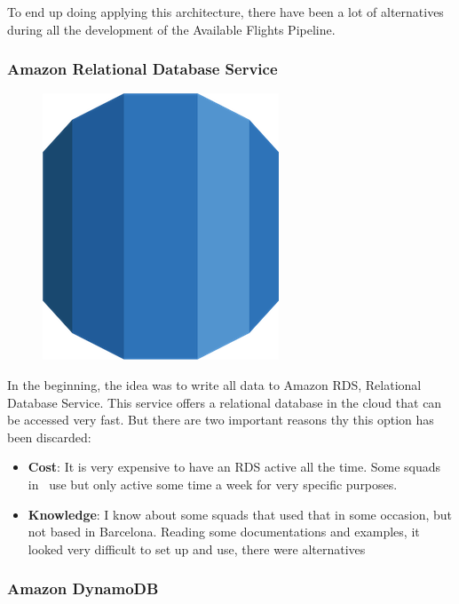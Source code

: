 To end up doing applying this architecture, there have been a lot of alternatives during all the development of the Available Flights Pipeline.

\subsubsection{Amazon Relational Database Service} \label{rds}

\begin{figure}[H]
\includegraphics[scale=0.1]{resources/rds-logo.png}
\end{figure}

In the beginning, the idea was to write all data to Amazon RDS, Relational Database Service\cite{rds}. This service offers a relational database in the cloud that can be accessed very fast. But there are two important reasons thy this option has been discarded:

\begin{itemize}
    \item \textbf{Cost}: It is very expensive to have an RDS active all the time. Some squads in \company\ use  but only active some time a week for very specific purposes.
    \item \textbf{Knowledge}: I know about some squads that used that in some occasion, but not based in Barcelona. Reading some documentations and examples, it looked very difficult to set up and use, there were alternatives 
\end{itemize}

\subsubsection{Amazon DynamoDB} \label{dynamodb}

